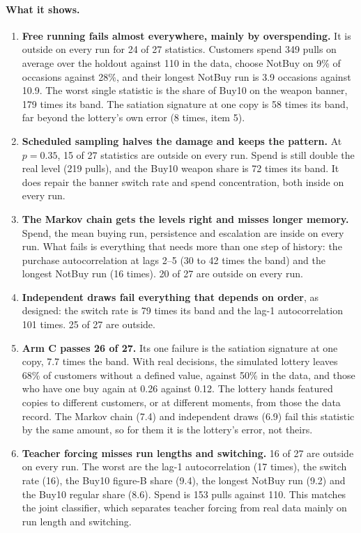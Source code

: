 \documentclass[11pt]{article}
\begin{document}
\paragraph{What it shows.}
\begin{enumerate}
\item \textbf{Free running fails almost everywhere, mainly by overspending.} It
  is outside on every run for 24 of 27 statistics. Customers spend 349 pulls on
  average over the holdout against 110 in the data, choose NotBuy on 9\% of
  occasions against 28\%, and their longest NotBuy run is 3.9 occasions against
  10.9. The worst single statistic is the share of Buy10 on the weapon banner,
  179 times its band. The satiation signature at one copy is 58 times its band,
  far beyond the lottery's own error (8 times, item 5).
\item \textbf{Scheduled sampling halves the damage and keeps the pattern.} At
  $p = 0.35$, 15 of 27 statistics are outside on every run. Spend is still
  double the real level (219 pulls), and the Buy10 weapon share is 72 times its
  band. It does repair the banner switch rate and spend concentration, both
  inside on every run.
\item \textbf{The Markov chain gets the levels right and misses longer memory.}
  Spend, the mean buying run, persistence and escalation are inside on every
  run. What fails is everything that needs more than one step of history: the
  purchase autocorrelation at lags 2--5 (30 to 42 times the band) and the
  longest NotBuy run (16 times). 20 of 27 are outside on every run.
\item \textbf{Independent draws fail everything that depends on order}, as
  designed: the switch rate is 79 times its band and the lag-1 autocorrelation
  101 times. 25 of 27 are outside.
\item \textbf{Arm C passes 26 of 27.} Its one failure is the satiation signature
  at one copy, 7.7 times the band. With real decisions, the simulated lottery
  leaves 68\% of customers without a defined value, against 50\% in the data,
  and those who have one buy again at 0.26 against 0.12. The lottery hands
  featured copies to different customers, or at different moments, from those
  the data record. The Markov chain (7.4) and independent draws (6.9) fail this
  statistic by the same amount, so for them it is the lottery's error, not
  theirs.
\item \textbf{Teacher forcing misses run lengths and switching.} 16 of 27 are
  outside on every run. The worst are the lag-1 autocorrelation (17 times), the
  switch rate (16), the Buy10 figure-B share (9.4), the longest NotBuy run
  (9.2) and the Buy10 regular share (8.6). Spend is 153 pulls against 110. This
  matches the joint classifier, which separates teacher forcing from real data
  mainly on run length and switching.
\end{enumerate}
\end{document}

